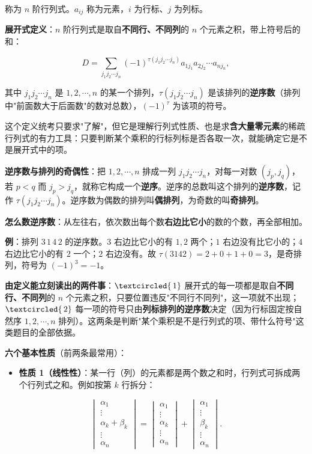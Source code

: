 \documentclass[11pt,openany,UTF8]{ctexbook}
\newcommand{\circled}[1]{\textcircled{\scriptsize\,#1}}
\begin{document}
称为 $n$ 阶行列式。$a_{ij}$ 称为元素，$i$ 为行标、$j$ 为列标。

\textbf{展开式定义}：$n$ 阶行列式是取自\textbf{不同行、不同列}的 $n$ 个元素之积，带上符号后的和：

\[D=\sum_{j_1j_2\cdots j_n}(-1)^{\tau(j_1j_2\cdots j_n)}a_{1j_1}a_{2j_2}\cdots a_{nj_n},\]

其中 $j_1j_2\cdots j_n$ 是 $1,2,\cdots,n$ 的某一个排列，$\tau(j_1j_2\cdots j_n)$ 是该排列的\textbf{逆序数}（排列中"前面数大于后面数"的数对总数），$(-1)^{\tau}$ 为该项的符号。

这个定义统考只要求"了解"，但它是理解行列式性质、也是求\textbf{含大量零元素}的稀疏行列式的有力工具：只要判断某个乘积的行标列标是否各取一次，就能确定它是不是展开式中的项。

\textbf{逆序数与排列的奇偶性}：把 $1,2,\cdots,n$ 排成一列 $j_1j_2\cdots j_n$，对每一对数 $(j_p,j_q)$，若 $p<q$ 而 $j_p>j_q$，就称它构成一个\textbf{逆序}。逆序的总数叫这个排列的\textbf{逆序数}，记作 $\tau(j_1j_2\cdots j_n)$。逆序数为偶数的排列叫\textbf{偶排列}，为奇数的叫\textbf{奇排列}。

\textbf{怎么数逆序数}：从左往右，依次数出每个数\textbf{右边比它小}的数的个数，再全部相加。

\textbf{例}：排列 $3\,1\,4\,2$ 的逆序数。$3$ 右边比它小的有 $1,2$ 两个；$1$ 右边没有比它小的；$4$ 右边比它小的有 $2$ 一个；$2$ 右边没有。故 $\tau(3142)=2+0+1+0=3$，是奇排列，符号为 $(-1)^3=-1$。

\textbf{由定义能立刻读出的两件事}：$\circled{1}$ 展开式的每一项都是取自\textbf{不同行、不同列}的 $n$ 个元素之积，只要位置违反"不同行不同列"，这一项就不出现；$\circled{2}$ 每一项的符号只由\textbf{列标排列的逆序数}决定（因为行标固定按自然序 $1,2,\cdots,n$ 排列）。这两条是判断"某个乘积是不是行列式的项、带什么符号"这类题目的全部依据。

\textbf{六个基本性质}（前两条最常用）：

\begin{itemize}
\item \textbf{性质 1（线性性）}：某一行（列）的元素都是两个数之和时，行列式可拆成两个行列式之和。例如按第 $k$ 行拆分：
\end{itemize}
\[\begin{vmatrix}\alpha_1\\\vdots\\\alpha_k+\beta_k\\\vdots\\\alpha_n\end{vmatrix}=\begin{vmatrix}\alpha_1\\\vdots\\\alpha_k\\\vdots\\\alpha_n\end{vmatrix}+\begin{vmatrix}\alpha_1\\\vdots\\\beta_k\\\vdots\\\alpha_n\end{vmatrix}.\]
\end{document}
